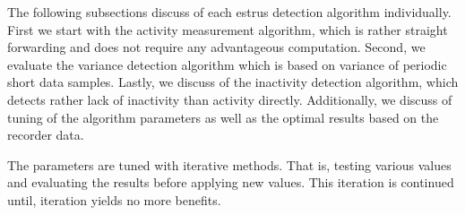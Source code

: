\documentclass[english,12pt,a4paper,pdftex,elec,utf8]{aaltothesis}
\begin{document}
The following subsections discuss of each estrus detection algorithm individually. First we start with the activity measurement algorithm, which is rather straight forwarding and does not require any advantageous computation. Second, we evaluate the variance detection algorithm which is based on variance of periodic short data samples. Lastly, we discuss of the inactivity detection algorithm, which detects rather lack of inactivity than activity directly. Additionally, we discuss of tuning of the algorithm parameters as well as the optimal results based on the recorder data. 

The parameters are tuned with iterative methods. That is, testing various values and evaluating the results before applying new values. This iteration is continued until, iteration yields no more benefits.
\end{document}
